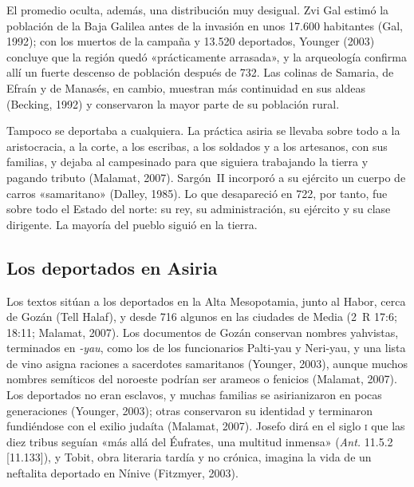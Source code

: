 \documentclass[11pt,letterpaper]{article}
\begin{document}
El promedio oculta, además, una distribución muy desigual. Zvi Gal estimó la población de la Baja Galilea antes de la invasión en unos 17.600 habitantes (Gal, 1992); con los muertos de la campaña y 13.520 deportados, Younger (2003) concluye que la región quedó «prácticamente arrasada», y la arqueología confirma allí un fuerte descenso de población después de 732. Las colinas de Samaria, de Efraín y de Manasés, en cambio, muestran más continuidad en sus aldeas (Becking, 1992) y conservaron la mayor parte de su población rural.

Tampoco se deportaba a cualquiera. La práctica asiria se llevaba sobre todo a la aristocracia, a la corte, a los escribas, a los soldados y a los artesanos, con sus familias, y dejaba al campesinado para que siguiera trabajando la tierra y pagando tributo (Malamat, 2007). Sargón~II incorporó a su ejército un cuerpo de carros «samaritano» (Dalley, 1985). Lo que desapareció en 722, por tanto, fue sobre todo el Estado del norte: su rey, su administración, su ejército y su clase dirigente. La mayoría del pueblo siguió en la tierra.

\subsection{Los deportados en Asiria}
Los textos sitúan a los deportados en la Alta Mesopotamia, junto al Habor, cerca de Gozán (Tell Halaf), y desde 716 algunos en las ciudades de Media (2~R 17:6; 18:11; Malamat, 2007). Los documentos de Gozán conservan nombres yahvistas, terminados en \emph{-yau}, como los de los funcionarios Palti-yau y Neri-yau, y una lista de vino asigna raciones a sacerdotes samaritanos (Younger, 2003), aunque muchos nombres semíticos del noroeste podrían ser arameos o fenicios (Malamat, 2007). Los deportados no eran esclavos, y muchas familias se asirianizaron en pocas generaciones (Younger, 2003); otras conservaron su identidad y terminaron fundiéndose con el exilio judaíta (Malamat, 2007). Josefo dirá en el siglo \textsc{i} que las diez tribus seguían «más allá del Éufrates, una multitud inmensa» (\emph{Ant.} 11.5.2 [11.133]), y Tobit, obra literaria tardía y no crónica, imagina la vida de un neftalita deportado en Nínive (Fitzmyer, 2003).
\end{document}
